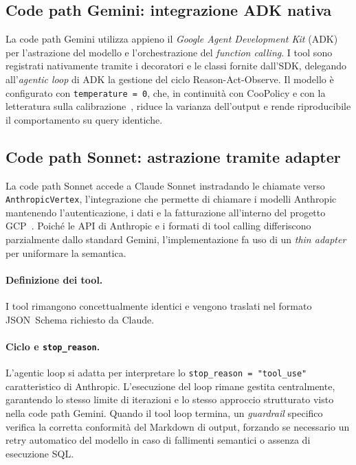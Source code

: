 \subsection{Code path Gemini: integrazione ADK nativa}
\label{subsec:sysaid-gemini}

La code path Gemini utilizza appieno il \emph{Google Agent Development Kit} (ADK)
per l'astrazione del modello e l'orchestrazione del \emph{function calling}. I tool sono
registrati nativamente tramite i decoratori e le classi fornite dall'SDK,
delegando all'\emph{agentic loop} di ADK la gestione del ciclo Reason-Act-Observe.
Il modello è configurato con \texttt{temperature = 0},
che, in continuità con CooPolicy e con la letteratura sulla
calibrazione~\cite{kadavath2022knowsknows}, riduce la varianza
dell'output e rende riproducibile il comportamento su query
identiche.

\subsection{Code path Sonnet: astrazione tramite adapter}
\label{subsec:sysaid-sonnet}

La code path Sonnet accede a Claude Sonnet
instradando le chiamate verso \texttt{AnthropicVertex},
l'integrazione che permette di chiamare i modelli Anthropic mantenendo l'autenticazione, i dati
e la fatturazione all'interno del progetto GCP~\cite{anthropic_docs}. Poiché le API di Anthropic
e i formati di tool calling differiscono parzialmente dallo standard Gemini,
l'implementazione fa uso di un \emph{thin adapter} per uniformare la semantica.

\paragraph{Definizione dei tool.} I tool rimangono concettualmente identici e
vengono traslati nel formato JSON~Schema richiesto da Claude.

\paragraph{Ciclo e \texttt{stop\_reason}.} L'agentic loop si adatta per interpretare
lo \texttt{stop\_reason = "tool\_use"} caratteristico di Anthropic.
L'esecuzione del loop rimane gestita centralmente, garantendo lo stesso limite di iterazioni
e lo stesso approccio strutturato visto nella code path Gemini. Quando il tool loop termina,
un \emph{guardrail} specifico verifica la corretta conformità del Markdown di output, forzando
se necessario un retry automatico del modello in caso di fallimenti semantici o assenza di esecuzione SQL.

